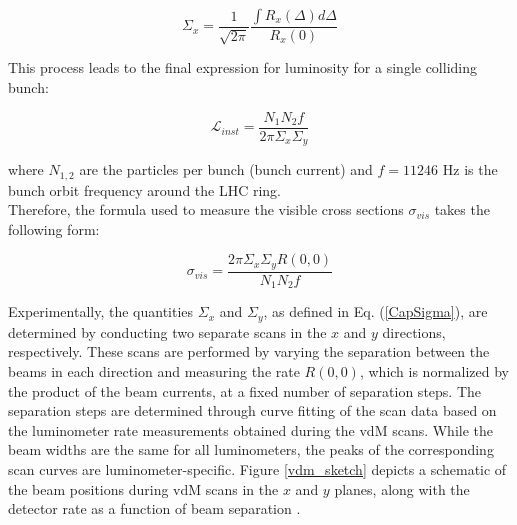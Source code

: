 \begin{equation}
\Sigma_{x}= \frac{1}{\sqrt{2\pi}} \frac{\int R_{x}(\Delta)d\Delta}{R_{x}(0)}
\label{CapSigma}
\end{equation}

This process leads to the final expression for luminosity for a single colliding bunch:

\begin{equation}
\mathcal{L}_{inst}=\frac{N_{1} N_{2}f}{2 \pi \Sigma_{x}\Sigma_{y}}
\end{equation}

where $N_{1,2}$ are the particles per bunch (bunch current) and  $f= 11246$ Hz is the bunch orbit frequency around the LHC ring.\\

Therefore, the formula used to measure the visible cross sections $\sigma_{vis}$ takes the following form:

\begin{equation}
  \sigma_{vis}=\frac{2\pi \Sigma_{x} \Sigma_{y} R(0, 0)}{N_{1}N_{2} f}
  \label{sigmavis_eq}
\end{equation}

Experimentally, the quantities $\Sigma_{x}$ and $\Sigma_{y}$, as defined in Eq. (\ref{CapSigma}), are determined by conducting two separate scans in the $x$ and $y$ directions, respectively. These scans are performed by varying the separation between the beams in each direction and measuring the rate $R(0,0)$, which is normalized by the product of the beam currents, at a fixed number of separation steps. The separation steps are determined through curve fitting of the scan data based on the luminometer rate measurements obtained during the vdM scans. While the beam widths are the same for all luminometers, the peaks of the corresponding scan curves are luminometer-specific. Figure \ref{vdm_sketch} depicts a schematic of the beam positions during vdM scans in the $x$ and $y$ planes, along with the detector rate as a function of beam separation  \cite{pas_18}.

